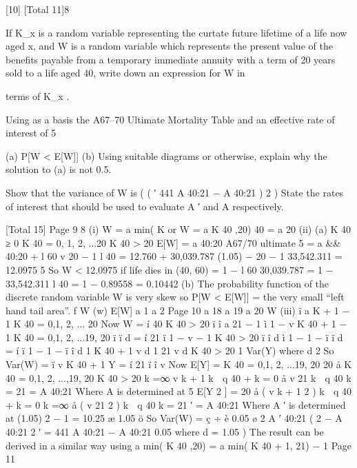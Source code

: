 \documentclass[a4paper,1pt]{article}
\begin{document}
[10]
[Total 11]8
\item  If K_x is a random variable representing the curtate future lifetime of a life
now aged x, and W is a random variable which represents the present
value of the benefits payable from a temporary immediate annuity with a
term of 20 years sold to a life aged 40, write down an expression for W in

terms of K_x .
\item  Using as a basis the A67–70 Ultimate Mortality Table and an effective
rate of interest of 5%
\item 
(a) P[W < E[W]]
(b) Using suitable diagrams or otherwise, explain why the solution to
(a) is not 0.5.

Show that the variance of W is
(
(
′
441 A 40:21
− A 40:21
)
2
)
State the rates of interest that should be used to evaluate A ′ and A
respectively.

[Total 15]
Page 9 %
8
(i)
W = a min( K
or
W = a K
40 ,20)
40
= a 20
(ii)
(a)
K 40 ≥ 0
K 40 = 0, 1, 2, ...20
K 40 > 20
E[W] = a 40:20 A67/70 ultimate 5%
= a && 40:20 +
l 60 v 20
− 1
l 40
= 12.760 +
30,039.787 (1.05) − 20
− 1
33,542.311
= 12.0975
5%
So W < 12.0975 if life dies in (40, 60)
= 1 −
l 60
30,039.787
= 1 −
33,542.311
l 40
= 1 − 0.89558 = 0.10442
(b)
The probability function of the discrete random variable W is very
skew so P[W < E[W]] = the very small “left hand tail area”.
f W (w)
E[W]
a 1 a 2
Page 10
a 18 a 19 a 20
W %
(iii)
ï a  K + 1 − 1 K 40 = 0,1, 2, ... 20
Now W = í 40
K 40 > 20
ï
î a  21 − 1
ì 1 − v K 40 + 1
− 1 K 40 = 0,1, 2, ...19, 20
ï
ï
d
= í
21
ï 1 − v − 1
K 40 > 20
ï
î d
ì 1
− 1 −
ï
ï d
= í
ï 1 − 1 −
ï
î d
1 K 40 + 1
v
d
1 21
v
d
K 40 > 20
1
Var(Y) where
d 2
So Var(W) =
ï v K 40 + 1
Y = í 21
ï
î v
Now E[Y] =
K 40 = 0,1, 2, ...19, 20
20
å
K 40 = 0,1, 2, ...,19, 20
K 40 > 20
k =∞
v k + 1 k  q 40 +
k = 0
å v
21
k  q 40
k = 21
= A 40:21
Where A is determined at 5%
E[Y 2 ] =
20
å ( v
k + 1 2
) k  q 40 +
k = 0
k =∞
å ( v
21 2
) k  q 40
k = 21
′
= A 40:21
Where A ′ is determined at (1.05) 2 − 1 = 10.25%
æ 1.05 ö
So Var(W) = ç
÷
è 0.05 ø
2
{ A ′
40:21
(
2
− A 40:21
2
′
= 441 A 40:21
− A 40:21
0.05
} where d = 1.05
)
The result can be derived in a similar way using
a min( K
40 ,20)
= a  min( K
40 + 1,
21)
− 1
Page 11 %
\end{document}
